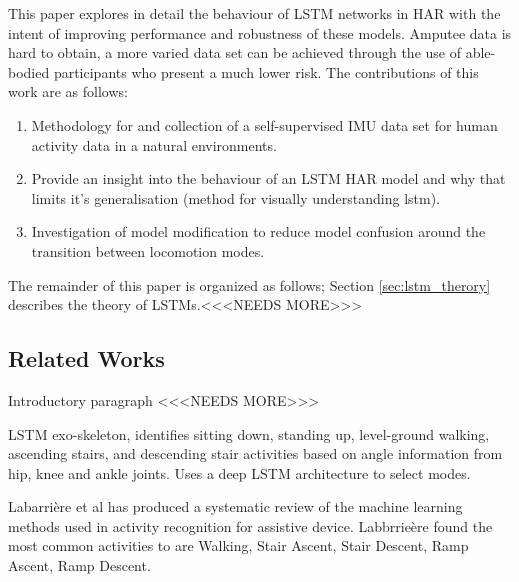 This paper explores in detail the behaviour of LSTM networks in HAR with the intent of improving performance and robustness of these models. Amputee data is hard to obtain, a more varied data set can be achieved through the use of able-bodied participants who present a much lower risk. The contributions of this work are as follows:
\begin{enumerate}
\item Methodology for and collection of a self-supervised IMU data set for human activity data in a natural environments.
\item Provide an insight into the behaviour of an LSTM HAR model and why that limits it's generalisation (method for visually understanding lstm).
\item Investigation of model modification to reduce model confusion around the transition between locomotion modes.
\end{enumerate}

The remainder of this paper is organized as follows; Section \ref{sec:lstm_therory} describes the theory of LSTMs.<<<NEEDS MORE>>>

\subsection{Related Works}
\label{sec:related_works}
Introductory paragraph <<<NEEDS MORE>>>

LSTM exo-skeleton\cite{Wang2018}, identifies sitting down, standing up, level-ground walking, ascending stairs, and descending stair activities based on angle information from hip, knee and ankle joints. Uses a deep LSTM architecture to select modes.

Labarri\`ere et al has produced a systematic review of the machine learning methods used in activity recognition for assistive device\cite{Labarriere2020}. Labbrrie\`ere found the most common activities to are Walking, Stair Ascent, Stair Descent, Ramp Ascent, Ramp Descent.

